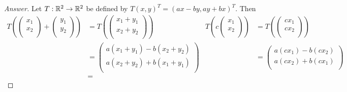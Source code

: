\documentclass[../psets.tex]{subfiles}
\begin{document}
\begin{enumerate}[label={\textbf{3.\arabic*.}}]
\begin{enumerate}
\begin{proof}[Answer]
            Let $T:\mathbb{R}^2\to\mathbb{R}^2$ be defined by $T(x,y)^T=(ax-by,ay+bx)^T$. Then
            \begin{align*}
                T\left( 
                    \begin{pmatrix}
                        x_1\\
                        x_2\\
                    \end{pmatrix}
                    +
                    \begin{pmatrix}
                        y_1\\
                        y_2\\
                    \end{pmatrix}
                \right) &= T\left( 
                    \begin{pmatrix}
                        x_1+y_1\\
                        x_2+y_2\\
                    \end{pmatrix}
                \right)&
                    T\left( c
                        \begin{pmatrix}
                            x_1\\
                            x_2\\
                        \end{pmatrix}
                    \right) &= T\left( 
                        \begin{pmatrix}
                            cx_1\\
                            cx_2\\
                        \end{pmatrix}
                    \right)\\
                &=
                \begin{pmatrix}
                    a(x_1+y_1)-b(x_2+y_2)\\
                    a(x_2+y_2)+b(x_1+y_1)\\
                \end{pmatrix}&
                    &=
                    \begin{pmatrix}
                        a(cx_1)-b(cx_2)\\
                        a(cx_2)+b(cx_1)\\
                    \end{pmatrix}\\
                &=

\end{align*}
\end{proof}
\end{enumerate}
\end{enumerate}
\end{document}
